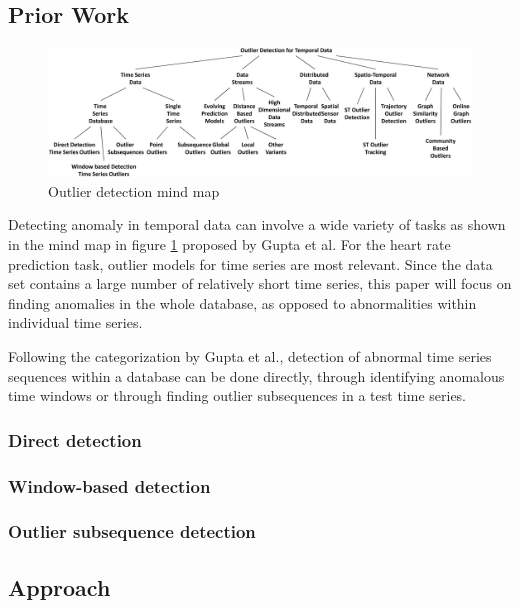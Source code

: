 \documentclass[12pt]{article}
\begin{document}
    \subsection{Prior Work}
    \begin{figure}[h!]
        \centering
        \includegraphics[width=0.9\linewidth]{gupta2014-mind_map.png}
        \caption{Outlier detection mind map \autocite{Gupta2013}}
        \label{fig:mindmap}
    \end{figure}
    Detecting anomaly in temporal data can involve a wide variety of tasks as shown in the mind map in figure \ref{fig:mindmap} proposed by Gupta et al. For the heart rate prediction task, outlier models for time series are most relevant. Since the data set contains a large number of relatively short time series, this paper will focus on finding anomalies in the whole database, as opposed to abnormalities within individual time series.

    Following the categorization by Gupta et al., detection of abnormal time series sequences within a database can be done directly, through identifying anomalous time windows or through finding outlier subsequences in a test time series.
    \subsubsection{Direct detection}
    \subsubsection{Window-based detection}
    \subsubsection{Outlier subsequence detection}

    \subsection{Approach}


\end{document}
